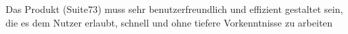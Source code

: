 Das Produkt (Suite73) muss sehr benutzerfreundlich und effizient gestaltet sein, die es dem Nutzer erlaubt, schnell und ohne tiefere Vorkenntnisse zu arbeiten